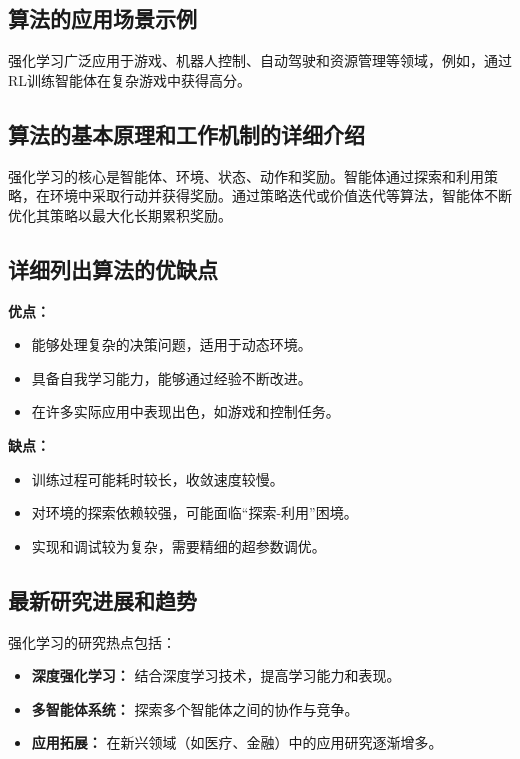 \subsection*{算法的应用场景示例}
强化学习广泛应用于游戏、机器人控制、自动驾驶和资源管理等领域，例如，通过RL训练智能体在复杂游戏中获得高分。

\subsection*{算法的基本原理和工作机制的详细介绍}
强化学习的核心是智能体、环境、状态、动作和奖励。智能体通过探索和利用策略，在环境中采取行动并获得奖励。通过策略迭代或价值迭代等算法，智能体不断优化其策略以最大化长期累积奖励。

\subsection*{详细列出算法的优缺点}
\textbf{优点：}
\begin{itemize}
    \item 能够处理复杂的决策问题，适用于动态环境。
    \item 具备自我学习能力，能够通过经验不断改进。
    \item 在许多实际应用中表现出色，如游戏和控制任务。
\end{itemize}

\textbf{缺点：}
\begin{itemize}
    \item 训练过程可能耗时较长，收敛速度较慢。
    \item 对环境的探索依赖较强，可能面临“探索-利用”困境。
    \item 实现和调试较为复杂，需要精细的超参数调优。
\end{itemize}

\subsection*{最新研究进展和趋势}
强化学习的研究热点包括：
\begin{itemize}
    \item \textbf{深度强化学习：} 结合深度学习技术，提高学习能力和表现。
    \item \textbf{多智能体系统：} 探索多个智能体之间的协作与竞争。
    \item \textbf{应用拓展：} 在新兴领域（如医疗、金融）中的应用研究逐渐增多。
\end{itemize}
